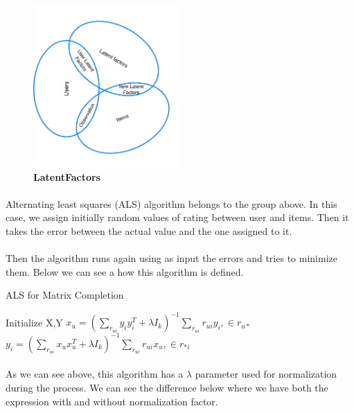 \begin{figure}[h]
	\centering
	\includegraphics[width=0.5\textwidth]{images/LatentFactors.png}
	\caption{\bfseries LatentFactors}
	\label{LatentFactors}
\end{figure}


\paragraph{} Alternating least squares (ALS) algorithm belongs to the group above. In this case, we assign initially random values of rating between user and items. Then it takes the error between the actual value and the one assigned to it. 
\pagebreak
\paragraph{}Then the algorithm runs again using as input the errors and tries to minimize them. Below we can see a how this algorithm is defined.

\begin{algorithm}
	\caption{ALS for Matrix Completion}\label{ALS}
	\begin{algorithmic}[1]
		\State Initialize X,Y
		\Repeat
		\State $x_{u} = (\sum_{r_{ui}}y_{i}y_{i}^{T} + \lambda I_k)^{-1} \sum_{r_{ui}}r_{ui}y_{i} ,\in r_{u*}$
		\EndFor
		\State $y_{i} = (\sum_{r_{ui}}x_{u}x_{u}^{T} + \lambda I_k)^{-1} \sum_{r_{ui}}r_{ui}x_{u} ,\in r_{*i}$
		\EndFor
	\end{algorithmic}
\end{algorithm}

\paragraph{}As we can see above, this algorithm has a $\lambda$ parameter used for normalization during the process. We can see the difference below where we have both the expression with and without normalization factor.

